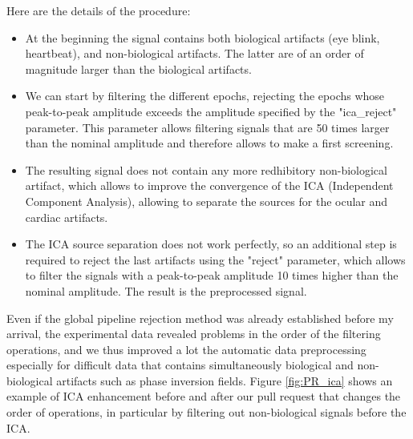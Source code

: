 Here are the details of the procedure:
\begin{itemize}
    \item At the beginning the signal contains both biological artifacts (eye blink, heartbeat), and non-biological artifacts. The latter are of an order of magnitude larger than the biological artifacts.
    \item We can start by filtering the different epochs, rejecting the epochs whose peak-to-peak amplitude exceeds the amplitude specified by the "ica\_reject" parameter. This parameter allows filtering signals that are 50 times larger than the nominal amplitude and therefore allows to make a first screening.
    \item The resulting signal does not contain any more redhibitory non-biological artifact, which allows to improve the convergence of the ICA (Independent Component Analysis), allowing to separate the sources for the ocular and cardiac artifacts.
    \item The ICA source separation does not work perfectly, so an additional step is required to reject the last artifacts using the "reject" parameter, which allows to filter the signals with a peak-to-peak amplitude 10 times higher than the nominal amplitude. The result is the preprocessed signal.
\end{itemize}

Even if the global pipeline rejection method was already established before my arrival, the experimental data revealed problems in the order of the filtering operations, and we thus improved a lot the automatic data preprocessing especially for difficult data that contains simultaneously biological and non-biological artifacts such as phase inversion fields. Figure \ref{fig:PR_ica} shows an example of ICA enhancement before and after our pull request that changes the order of operations, in particular by filtering out non-biological signals before the ICA.


